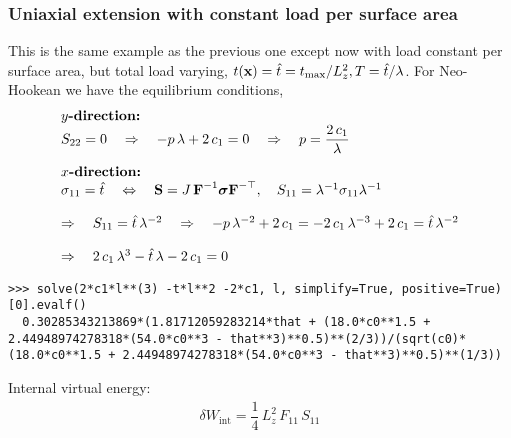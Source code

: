 \subsubsection{Uniaxial extension with constant load per surface area}
This is the same example as the previous one except now with load constant per surface area, but total load varying, ${t(\textbf{x}) = \hat{t} = t_\text{max}/L_z^2}, {T = \hat{t}/\lambda}$. For Neo-Hookean we have the equilibrium conditions,
\begin{equation*}
  \begin{array}{lll}
    \textbf{$y$-direction:}\\
    S_{22} = 0  \quad\Rightarrow\quad -p\,\lambda + 2\,c_1 = 0\quad\Rightarrow\quad p = \displaystyle\frac{\displaystyle{2\,c_1}}{\displaystyle{\lambda}}\,\\[4mm]
    \textbf{$x$-direction:}\\
    \sigma_{11} = \hat{t} \quad \Leftrightarrow \quad
    \textbf{S} = J\,\textbf{F}^{-1} \boldsymbol{\sigma} \textbf{F}^{-\top}, \quad S_{11} = \lambda^{-1} \sigma_{11} \lambda^{-1}\\[4mm]
    \Rightarrow \quad S_{11} = \hat{t} \, \lambda^{-2}
    \quad \Rightarrow \quad -p\,\lambda^{-2} + 2\,c_1 = -2\,c_1\,\lambda^{-3} + 2\,c_1 = \hat{t}\,\lambda^{-2}\\[4mm]
    \Rightarrow \quad 2\,c_1\,\lambda^3 - \hat{t}\,\lambda-2\,c_1  = 0
  \end{array}
\end{equation*}

\begin{lstlisting}[columns=fixed,basicstyle=\ttfamily]
  >>> solve(2*c1*l**(3) -t*l**2 -2*c1, l, simplify=True, positive=True)[0].evalf()
  0.30285343213869*(1.81712059283214*that + (18.0*c0**1.5 + 2.44948974278318*(54.0*c0**3 - that**3)**0.5)**(2/3))/(sqrt(c0)*(18.0*c0**1.5 + 2.44948974278318*(54.0*c0**3 - that**3)**0.5)**(1/3))
\end{lstlisting}

Internal virtual energy:
\begin{equation*}
  \begin{array}{lll}
    δW_\text{int} = \dfrac14 \,L_z^2 \,F_{11}\,S_{11}
  \end{array}
\end{equation*}

